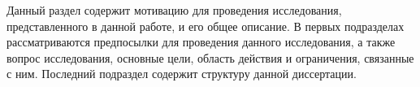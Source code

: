 %
%
Данный раздел содержит мотивацию для проведения исследования, представленного в данной работе, и его общее описание.
%
В первых подразделах рассматриваются предпосылки для проведения данного исследования, а также вопрос исследования, основные цели, область действия и ограничения, связанные с ним.
%
Последний подраздел содержит структуру данной диссертации.